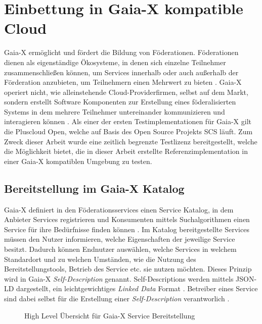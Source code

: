 \chapter{Einbettung in Gaia-X kompatible Cloud}
\label{chapter:gaia-x-einbettung}
Gaia-X ermöglicht und fördert die Bildung von Föderationen.
Föderationen dienen als eigenständige Ökosysteme, in denen sich einzelne Teilnehmer zusammenschließen können,
um Services innerhalb oder auch außerhalb der Förderation anzubieten, um Teilnehmern einen Mehrwert zu bieten \cite{GXFS2021}.
Gaia-X operiert nicht, wie alleinstehende Cloud-Providerfirmen, selbst auf dem Markt, sondern erstellt
Software Komponenten zur Erstellung eines föderalisierten Systems in dem mehrere Teilnehmer
untereinander kommunizieren und interagieren können \cite{GXFS2021}.
Als einer der ersten Testimplementationen für Gaia-X gilt die Pluscloud Open,
welche auf Basis des Open Source Projekts \ac{SCS} läuft.
Zum Zweck dieser Arbeit wurde eine zeitlich begrenzte Testlizenz bereitgestellt,
welche die Möglichkeit bietet, die in dieser Arbeit erstellte Referenzimplementation
in einer Gaia-X kompatiblen Umgebung zu testen.


\section{Bereitstellung im Gaia-X Katalog}
\label{sec:gaia-x-einbettung:gaia-x-katalog}
Gaia-X definiert in den Föderationsservices einen Service Katalog, in dem Anbieter Services registrieren
und Konsumenten mittels Suchalgorithmen einen Service für ihre Bedürfnisse finden können \cite{GaiaXArchitecture2021}.
Im Katalog bereitgestellte Services müssen den Nutzer informieren, welche Eigenschaften der jeweilige Service besitzt.
Dadurch können Endnutzer auswählen, welche Services in welchem Standardort 
und zu welchen Umständen, wie die Nutzung des Bereitstellungstools, Betrieb des Service etc. sie nutzen möchten.
Dieses Prinzip wird in Gaia-X \emph{Self-Description} genannt.
Self-Descriptions werden mittels JSON-LD dargestellt, ein
leichtgewichtiges \emph{Linked Data} Format \cite{Eggers2020}.
Betreiber eines Service sind dabei selbst für die Erstellung einer \emph{Self-Description} verantworlich \cite{GaiaXArchitecture2021}.

\begin{figure}
  \centering
  \caption{High Level Übersicht für Gaia-X Service Bereitstellung}
  \label{fig:gaia-x-orchestration-overview}
\end{figure}

